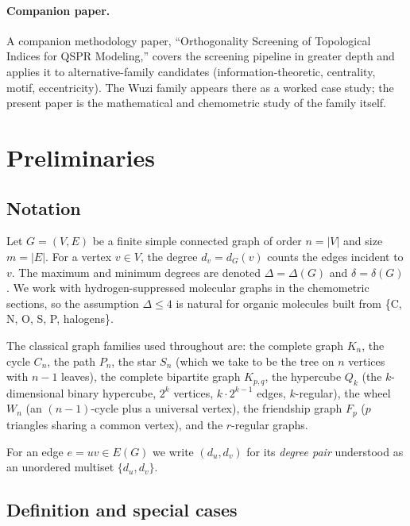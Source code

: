 \documentclass[11pt,a4paper]{article}
\theoremstyle{definition}
\begin{document}
\paragraph{Companion paper.}
A companion methodology paper, ``Orthogonality Screening of
Topological Indices for QSPR Modeling,'' covers the screening
pipeline in greater depth and applies it to alternative-family
candidates (information-theoretic, centrality, motif, eccentricity).
The Wuzi family appears there as a worked case study; the present
paper is the mathematical and chemometric study of the family
itself.

\section{Preliminaries}\label{sec:prelim}

\subsection{Notation}\label{sec:notation}

Let $G=(V,E)$ be a finite simple connected graph of order
$n=|V|$ and size $m=|E|$. For a vertex $v\in V$, the degree
$d_v=d_G(v)$ counts the edges incident to $v$. The maximum and
minimum degrees are denoted $\Delta=\Delta(G)$ and
$\delta=\delta(G)$. We work with hydrogen-suppressed molecular
graphs in the chemometric sections, so the assumption $\Delta\le 4$
is natural for organic molecules built from \{C, N, O, S, P, halogens\}.

The classical graph families used throughout are:
the complete graph $K_n$, the cycle $C_n$, the path $P_n$, the star
$S_n$ (which we take to be the tree on $n$ vertices with $n-1$
leaves), the complete bipartite graph $K_{p,q}$, the hypercube
$Q_k$ (the $k$-dimensional binary hypercube, $2^k$ vertices,
$k\cdot 2^{k-1}$ edges, $k$-regular), the wheel $W_n$ (an $(n-1)$-cycle
plus a universal vertex), the friendship graph $F_p$ ($p$
triangles sharing a common vertex), and the $r$-regular graphs.

For an edge $e=uv\in E(G)$ we write $(d_u,d_v)$ for its
\emph{degree pair} understood as an unordered multiset
$\{d_u,d_v\}$.

\subsection{Definition and special cases}\label{sec:def}
\end{document}
